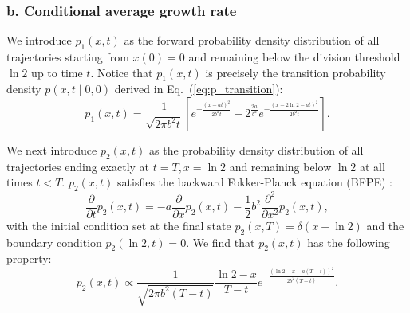 \documentclass[aps, prl, longbibliography, linenumbers, superscriptaddress]{revtex4-2}
\begin{document}
\subsubsection{b. Conditional average growth rate}
We introduce $p_1(x, t)$ as the forward probability density distribution of all trajectories starting from $x(0) = 0$ and remaining below the division threshold $\ln 2$ up to time $t$. Notice that $p_1(x, t)$ is precisely the transition probability density $p(x, t \mid 0, 0)$ derived in Eq.~(\ref{eq:p_transition}):
\begin{equation}
p_1(x, t) = \frac{1}{\sqrt{2\pi b^2 t}} \left[ e^{-\frac{(x-at)^2}{2b^2 t}} - 2^{\frac{2a}{b^2}} e^{-\frac{(x-2\ln 2-at)^2}{2b^2 t}} \right].
\label{eq:p1_sol}
\end{equation}

We next introduce $p_2(x, t)$ as the probability density distribution of all trajectories ending exactly at $t = T, x = \ln 2$ and remaining below $\ln 2$ at all times $t < T$. $p_2(x, t)$ satisfies the backward Fokker-Planck equation (BFPE) \cite{Gardiner2009stochastic}:
\begin{equation}
\frac{\partial}{\partial t}p_2(x, t) = -a\frac{\partial}{\partial x}p_2(x, t) - \frac{1}{2}b^2\frac{\partial^2}{\partial x^2}p_2(x, t),
\end{equation}
with the initial condition set at the final state $p_2 (x, T) = \delta(x-\ln 2)$ and the boundary condition $p_2 (\ln 2, t) = 0$. We find that $p_2(x, t)$ has the following property:
\begin{equation}
p_2 (x, t) \propto \frac{1}{\sqrt{2\pi b^2 (T-t)}} \frac{\ln 2 - x}{T-t} e^{-\frac{(\ln 2 - x - a(T-t))^2}{2b^2 (T-t)}}.
\label{eq:p2_sol}
\end{equation}
\end{document}

